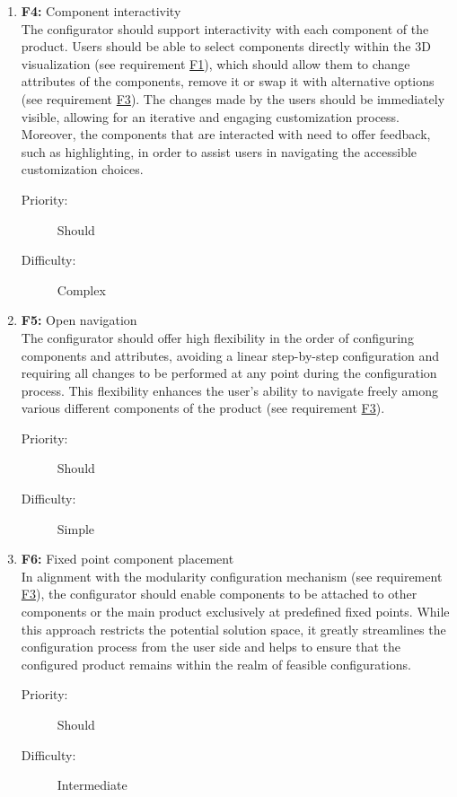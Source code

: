 \begin{enumerate}
\item \textbf{F4:} Component interactivity
\vspace{2pt}
\\The configurator should support interactivity with each component of the product. Users should be able to select components directly within the 3D visualization (see requirement \hyperref[itm:F1]{F1}), which should allow them to change attributes of the components, remove it or swap it with alternative options (see requirement \hyperref[itm:F3]{F3}). The changes made by the users should be immediately visible, allowing for an iterative and engaging customization process. Moreover, the components that are interacted with need to offer feedback, such as highlighting, in order to assist users in navigating the accessible customization choices.
\begin{description}
    \item[Priority:] Should
    \item[Difficulty:] Complex
\end{description}
\vspace{4pt}

\item \textbf{F5:} Open navigation
\vspace{2pt}
\\The configurator should offer high flexibility in the order of configuring components and attributes, avoiding a linear step-by-step configuration and requiring all changes to be performed at any point during the configuration process. This flexibility enhances the user's ability to navigate freely among various different components of the product (see requirement \hyperref[itm:F3]{F3}).
\begin{description}
    \item[Priority:] Should
    \item[Difficulty:] Simple
\end{description}
\vspace{4pt}

\item \textbf{F6:} \label{itm:F6} Fixed point component placement
\vspace{2pt}
\\In alignment with the modularity configuration mechanism (see requirement \hyperref[itm:F3]{F3}), the configurator should enable components to be attached to other components or the main product exclusively at predefined fixed points. While this approach restricts the potential solution space, it greatly streamlines the configuration process from the user side and helps to ensure that the configured product remains within the realm of feasible configurations.
\begin{description}
    \item[Priority:] Should
    \item[Difficulty:] Intermediate
\end{description}
\vspace{4pt}


\end{enumerate}
